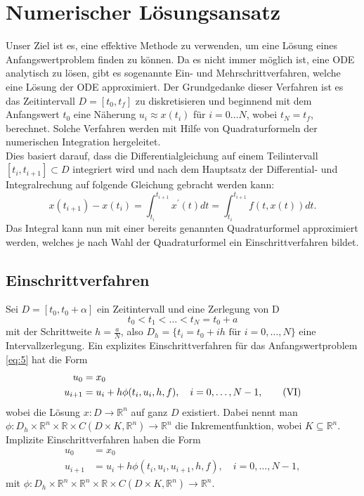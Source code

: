 \section{Numerischer Lösungsansatz}
Unser Ziel ist es, eine effektive Methode zu verwenden, um eine Lösung eines Anfangswertproblem finden zu können.
Da es nicht immer möglich ist, eine ODE analytisch zu lösen, gibt es sogenannte Ein- und Mehrschrittverfahren, welche
eine Lösung der ODE approximiert.
Der Grundgedanke dieser Verfahren ist es das Zeitintervall $D=[t_0,t_f]$ zu diskretisieren und beginnend mit dem
Anfangswert $t_0$ eine Näherung $u_i \approx x(t_i)$ für $i=0 \dots N$, wobei $t_N=t_f$, berechnet.
Solche Verfahren werden mit Hilfe von Quadraturformeln der numerischen
Integration \cite[Numerische Integration]{walzLexikonMathematik} hergeleitet.\\
Dies basiert darauf, dass die Differentialgleichung auf einem Teilintervall $[t_i, t_{i+1}] \subset D$
integriert wird und nach dem Hauptsatz der Differential- und Integralrechung auf folgende Gleichung gebracht werden kann:
\[
    x(t_{i+1}) - x(t_i) = \int_{t_i}^{t_{i+1}} x^{\prime}(t)dt = \int_{t_i}^{t_{i+1}}f(t, x(t))dt.
\]
Das Integral kann nun mit einer bereits genannten Quadraturformel approximiert werden, welches je nach Wahl der
Quadraturformel ein Einschrittverfahren bildet.
\subsection{Einschrittverfahren}
\begin{definition}
    Sei $D=[t_0,t_0+\alpha]$ ein Zeitintervall und eine Zerlegung von D
    \[
        t_0 < t_1 < \dots < t_N = t_0 + a
    \]
    mit der Schrittweite $h=\frac{a}{N}$, also $D_h=\{t_i=t_0 + ih \text{ für } i=0, \dots,N\}$ eine Intervallzerlegung.
    Ein explizites Einschrittverfahren für das Anfangswertproblem \eqref{eq:5} hat die Form
    \begin{align*}
        u_0 &= x_0\\
        u_{i+1} &= u_i + h\phi(t_i,u_i,h,f), \quad i=0,\dots,N-1, \label{eq:6} \tag{\RNum{6}}
    \end{align*}
    wobei die Lösung $x:D \rightarrow \mathbb{R}^{n}$ auf ganz $D$ existiert.
    Dabei nennt man
    $\phi:D_h \times \mathbb{R}^n \times \mathbb{R} \times C(D \times K,\mathbb{R}^n) \rightarrow \mathbb{R}^n$ die
    Inkrementfunktion, wobei $K \subseteq \mathbb{R}^n$.
    Implizite Einschrittverfahren haben die Form
    \begin{align*}
        u_0 &= x_0\\
        u_{i+1} &= u_i + h\phi(t_i,u_i,u_{i+1},h,f), \quad i=0,\dots,N-1,
    \end{align*}
    mit $\phi:D_h \times \mathbb{R}^n \times \mathbb{R}^n \times \mathbb{R} \times C(D \times K,\mathbb{R}^n)
    \rightarrow \mathbb{R}^n$.
\end{definition}
